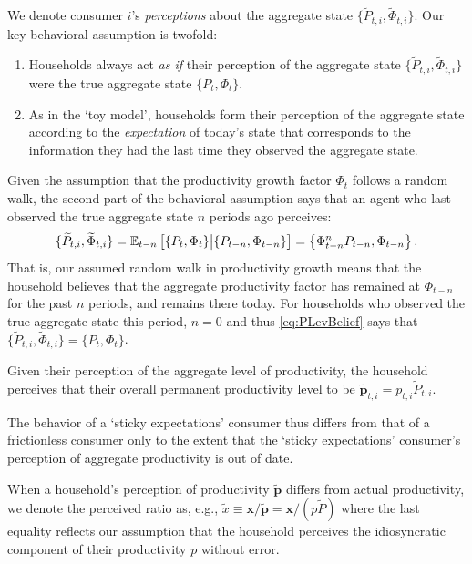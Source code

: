 \documentclass[titlepage]{./econtex}
\begin{document}
We denote consumer $i$'s \textit{perceptions} about the aggregate state $\{\widetilde{P}_{t,i},\widetilde{\Phi}_{t,i}\}$.  Our key behavioral assumption is twofold:
\begin{enumerate}
\item Households always act \textit{as if} their perception of the aggregate state $\{\widetilde{P}_{t,i},\widetilde{\Phi}_{t,i}\}$ were the true aggregate state $\{P_t,\Phi_t\}$.

\item As in the `toy model', households form their perception of the aggregate state according to the \textit{expectation} of today's state that corresponds to the information they had the last time they observed the aggregate state.
\end{enumerate}
Given the assumption that the productivity growth factor $\Phi_t$ follows a random walk,
the second part of the behavioral assumption says that an agent who last observed the true
aggregate state $n$ periods ago perceives:
\begin{equation}\label{eq:PLevBelief}
\{\widetilde{P}_{t,i},\widetilde{\Phi}_{t,i}\} = \operatorname{\mathbb{E}}_{t-n}\big[\{P_t,\Phi_t\} \big| \{P_{t-n},\Phi_{t-n}\}\big] = \left\{\Phi_{t-n}^{n} P_{t-n},\Phi_{t-n}\right\}.
\end{equation}
That is, our assumed random walk in productivity growth means that the household believes that the aggregate productivity factor has remained at $\Phi_{t-n}$ for the past $n$ periods, and remains there today. For households who observed the true aggregate state this period, $n=0$ and thus \eqref{eq:PLevBelief} says that $\{\widetilde{P}_{t,i},\widetilde{\Phi}_{t,i}\} = \{P_t,\Phi_t\}$.

Given their perception of the aggregate level of productivity, the household perceives that their overall permanent productivity level to be $\widetilde{\pmb{p}}_{t,i} = p_{t,i} \widetilde{P}_{t,i}$.

The behavior of a `sticky expectations' consumer thus differs from that of a frictionless consumer only to the extent that the `sticky expectations' consumer's perception of aggregate productivity is out of date.

When a household's perception of productivity $\widetilde{\pmb{p}}$ differs from actual productivity, we denote the perceived ratio as, e.g., $\widetilde{x} \equiv \mathbf{x}/\widetilde{\pmb{p}} = \mathbf{x}/({p}\widetilde{P})$ where the last equality reflects our assumption that the household perceives the idiosyncratic component of their productivity ${p}$ without error.
\end{document}
